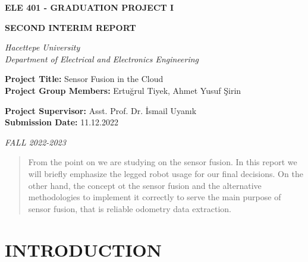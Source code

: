 \documentclass[12pt]{article}
\begin{document}
\begin{titlepage}
    \begin{center}
        \LARGE
        \textbf{ELE 401 - GRADUATION PROJECT I}

        \Large
        \textbf{SECOND INTERIM REPORT}

        \vspace{70pt}

        \textit{
            Hacettepe University \\
            Department of Electrical and Electronics Engineering
        }
    \end{center}

    \vspace{90pt}

    \large

    \textbf{Project Title:} Sensor Fusion in the Cloud \\

    \textbf{Project Group Members:} Ertuğrul Tiyek, Ahmet Yusuf Şirin

    \vspace{30pt}

    \textbf{Project Supervisor:} Asst. Prof. Dr. İsmail Uyanık \\

    \textbf{Submission Date:} 11.12.2022

    \vspace{\fill}

    \begin{center}
        \textit{FALL 2022-2023}
    \end{center}
\end{titlepage}

\clearpage

\tableofcontents
\listoffigures
\listoftables

\clearpage

\begin{abstract}
    From the point on we are studying on the sensor fusion. In this report we will briefly emphasize the legged robot usage for our final decisions. On the other hand, the concept ot the sensor fusion and the alternative methodologies to implement it correctly to serve the main purpose of sensor fusion, that is reliable odometry data extraction.
\end{abstract}

\section{INTRODUCTION}
\end{document}
